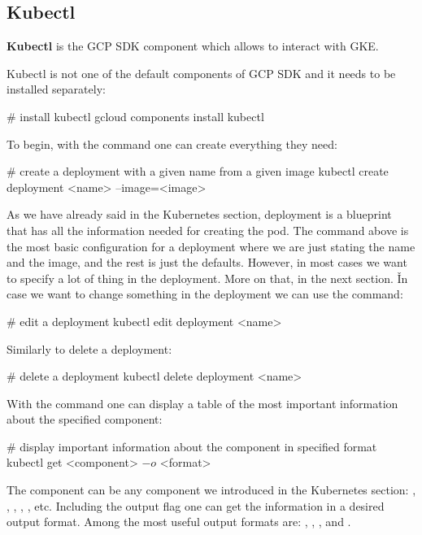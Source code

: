 
\subsection{Kubectl}

\bd[Kubectl]
\textbf{Kubectl} is the GCP SDK component which allows to interact with GKE\@.
\ed

Kubectl is not one of the default components of GCP SDK and it needs to be installed separately:
\begin{bash}
# install kubectl
gcloud components install kubectl
\end{bash}

To begin, with the  command one can create everything they need:
\begin{bash}
# create a deployment with a given name from a given image
kubectl create deployment <name> --image=<image>
\end{bash}

As we have already said in the Kubernetes section, deployment is a blueprint that has all the information needed for
creating the pod. The command above is the most basic configuration for a deployment where we are just stating the
name and the image, and the rest is just the defaults. However, in most cases we want to specify a lot of thing in
the deployment. More on that, in the next section. \v

In case we want to change something in the deployment we can use the  command:
\begin{bash}
# edit a deployment
kubectl edit deployment <name>
\end{bash}

Similarly to delete a deployment:
\begin{bash}
# delete a deployment
kubectl delete deployment <name>
\end{bash}

With the  command one can display a table of the most important information about the specified
component:
\begin{bash}
# display important information about the component in specified format
kubectl get <component> $-o$ <format>
\end{bash}

The component can be any component we introduced in the Kubernetes section: , , ,
, , etc. Including the output flag  one can get the information in a
desired output format. Among the most useful output formats are: , , ,
 and .

